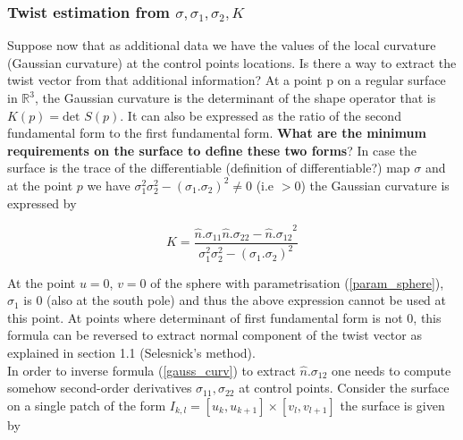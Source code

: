 \documentclass[a4paper, 11pt]{article}
\begin{document}
\subsubsection{Twist estimation from $\sigma, \sigma_1, \sigma_2, K$}

Suppose now that as additional data we have the values of the local curvature (Gaussian curvature) at the control points 
locations. Is there a way to extract the twist vector from that additional information? At a point p on a regular 
surface in $\mathbb{R}^3$, the Gaussian curvature is the determinant of the shape operator that is $K(p) = \text{det } 
S(p)$. It can also be expressed as the ratio of the second fundamental form to the first fundamental form. \textbf{What 
are the minimum requirements on the surface to define these two forms}? In case the surface is the trace of the 
differentiable (definition of differentiable?)  map $\sigma$ and at the point $p$ we have $\sigma_1^2 \sigma_2^2 - 
{(\sigma_1.\sigma_2)}^2 \neq 0$ (i.e $ > 0$) the Gaussian curvature is expressed by

\begin{equation}
  \label{gauss_curv}
  K = \frac{\hat{n}.\sigma_{11} \hat{n}.\sigma_{22} - {\hat{n}.\sigma_{12}}^2}{\sigma_1^2 \sigma_2^2 - 
  {(\sigma_1.\sigma_2)}^2}
\end{equation}

At the point $u=0$, $v=0$ of the sphere with parametrisation (\ref{param_sphere}), $\sigma_1$ is 0 (also at the south 
pole) and thus the above expression cannot be used at this point. At points where determinant of first fundamental form 
is not 0, this formula can be reversed to extract normal component of the twist vector as explained in section 1.1 
(Selesnick's method). \\

In order to inverse formula (\ref{gauss_curv}) to extract $\hat{n}.\sigma_{12}$ one needs to compute somehow 
second-order derivatives $\sigma_{11}, \sigma_{22}$ at control points. Consider the surface on a single patch of the 
form $I_{k,l} = [u_{k}, u_{k+1}]\times[v_l, v_{l+1}]$ the surface is given by
\end{document}
